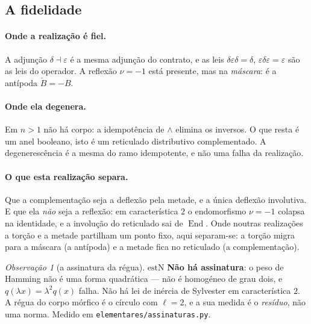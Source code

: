 \documentclass[11pt]{article}
\newcommand{\code}[1]{\texttt{\small #1}}
\theoremstyle{plain}
\theoremstyle{remark}
\providecommand{\est}{\ensuremath{\mathrm{est}}}
\newtheorem{observacao}[teorema]{Observação}
\begin{document}
\subsection{A fidelidade}

\paragraph{Onde a realização é fiel.} A adjunção $\delta\dashv\varepsilon$ é a mesma adjunção do contrato, e as
leis $\delta\varepsilon\delta=\delta$, $\varepsilon\delta\varepsilon=\varepsilon$ são as leis do operador. A
reflexão $\nu=-1$ está presente, mas na \emph{máscara}: é a antípoda $\check B=-B$.

\paragraph{Onde ela degenera.} Em $n>1$ não há corpo: a idempotência de $\wedge$ elimina os inversos. O que resta
é um anel booleano, isto é um reticulado distributivo complementado. A degenerescência é a mesma do ramo
idempotente, e não uma falha da realização.

\paragraph{O que esta realização separa.} Que a complementação seja a deflexão pela metade, e a única deflexão
involutiva. E que ela \emph{não} seja a reflexão: em característica $2$ o endomorfismo $\nu=-1$ colapsa na
identidade, e a involução do reticulado sai de $\operatorname{End}$. Onde noutras realizações a torção e a
metade partilham um ponto fixo, aqui separam-se: a torção migra para a máscara (a antípoda) e a metade fica no
reticulado (a complementação).

\begin{observacao}[a assinatura da régua]\label{obs:assinatura-2}
\est{N} \textbf{Não há assinatura}: o peso de Hamming não é uma forma quadrática --- não é homogéneo de grau
dois, e $q(\lambda x)=\lambda^2q(x)$ falha. Não há lei de inércia de Sylvester em característica $2$. A régua do
corpo mórfico é o círculo com $\ell=2$, e a sua medida é o \emph{resíduo}, não uma norma.
Medido em \code{elementares/assinaturas.py}.
\end{observacao}
\end{document}
